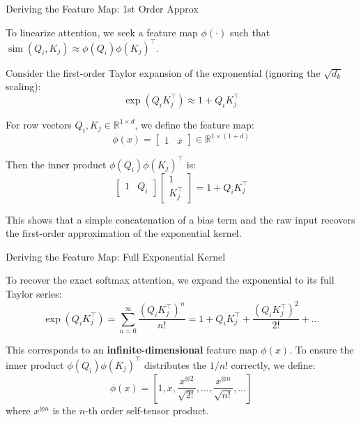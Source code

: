 \documentclass[aspectratio=169]{beamer}
\theoremstyle{definition}
\begin{document}
\begin{frame}{Deriving the Feature Map: 1st Order Approx}

To linearize attention, we seek a feature map $\phi(\cdot)$ such that $\operatorname{sim}(Q_i, K_j) \approx \phi(Q_i)\phi(K_j)^\top$. 

\vspace{0.5em}
Consider the first-order Taylor expansion of the exponential (ignoring the $\sqrt{d_k}$ scaling):
\begin{equation}
    \exp(Q_i K_j^\top) \approx 1 + Q_i K_j^\top
\end{equation}

For row vectors $Q_i, K_j \in \mathbb{R}^{1 \times d}$, we define the feature map:
\begin{equation}
    \phi(x) = \begin{bmatrix} 1 & x \end{bmatrix} \in \mathbb{R}^{1 \times (1+d)}
\end{equation}

Then the inner product $\phi(Q_i)\phi(K_j)^\top$ is:
\begin{equation}
    \begin{bmatrix} 1 & Q_i \end{bmatrix} \begin{bmatrix} 1 \\ K_j^\top \end{bmatrix} = 1 + Q_i K_j^\top
\end{equation}

This shows that a simple concatenation of a bias term and the raw input recovers the first-order approximation of the exponential kernel.

\end{frame}

\begin{frame}{Deriving the Feature Map: Full Exponential Kernel}

To recover the exact softmax attention, we expand the exponential to its full Taylor series:
\begin{equation}
    \exp(Q_i K_j^\top) = \sum_{n=0}^{\infty} \frac{(Q_i K_j^\top)^n}{n!} = 1 + Q_i K_j^\top + \frac{(Q_i K_j^\top)^2}{2!} + \dots
\end{equation}

This corresponds to an \textbf{infinite-dimensional} feature map $\phi(x)$. To ensure the inner product $\phi(Q_i)\phi(K_j)^\top$ distributes the $1/n!$ correctly, we define:
\begin{equation}
    \phi(x) = \left[ 1, x, \frac{x^{\otimes 2}}{\sqrt{2!}}, \dots, \frac{x^{\otimes n}}{\sqrt{n!}}, \dots \right]
\end{equation}
where $x^{\otimes n}$ is the $n$-th order self-tensor product. 


\end{frame}
\end{document}
